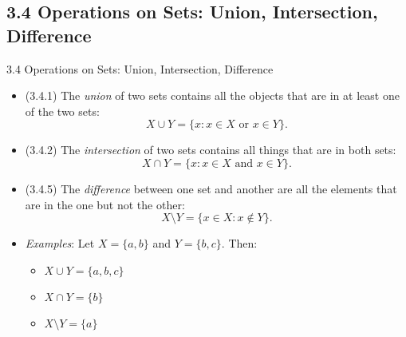 \documentclass[../slides.tex]{subfiles}
\begin{document}
\subsection{3.4 Operations on Sets: Union, Intersection, Difference}
\begin{frame}{3.4 Operations on Sets: Union, Intersection, Difference}

	\begin{itemize}
	
		\item (3.4.1) The \emph{union} of two sets contains all the objects that are in at least one of the two sets:	
		\[X\cup Y=\{x: x\in X\text{ or }x\in Y\}.\]
		
		
		\item (3.4.2) The \emph{intersection} of two sets contains all things that are in both sets:
		 \[X\cap Y=\{x:x\in X\text{ and }x\in Y\}.\]
	
		\item (3.4.5) The \emph{difference} between one set and another are all the elements that are in the one but not the other: \[X\setminus Y=\{x\in X:x\notin Y\}.\]
		
		\item \emph{Examples}: Let $X=\{a,b\}$ and $Y=\{b,c\}$. Then:
		
		\begin{itemize}
		
			\item $X\cup Y=\{a,b,c\}$
			
			\item $X\cap Y=\{b\}$
			
			\item $X\setminus Y=\{a\}$
		
		\end{itemize}
	
	\end{itemize}

\end{frame}
\end{document}

